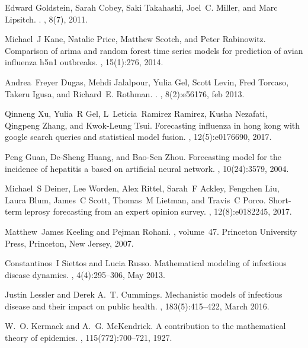 \documentclass[a4paper]{article}
\begin{document}
\begin{thebibliography}{100}
Edward Goldstein, Sarah Cobey, Saki Takahashi, Joel~C. Miller, and Marc
  Lipsitch.
.
, 8(7), 2011.

Michael~J Kane, Natalie Price, Matthew Scotch, and Peter Rabinowitz.
\newblock Comparison of arima and random forest time series models for
  prediction of avian influenza h5n1 outbreaks.
, 15(1):276, 2014.

Andrea~Freyer Dugas, Mehdi Jalalpour, Yulia Gel, Scott Levin, Fred Torcaso,
  Takeru Igusa, and Richard~E. Rothman.
.
, 8(2):e56176, feb 2013.

Qinneng Xu, Yulia~R Gel, L~Leticia~Ramirez Ramirez, Kusha Nezafati, Qingpeng
  Zhang, and Kwok-Leung Tsui.
\newblock Forecasting influenza in hong kong with google search queries and
  statistical model fusion.
, 12(5):e0176690, 2017.

Peng Guan, De-Sheng Huang, and Bao-Sen Zhou.
\newblock Forecasting model for the incidence of hepatitis a based on
  artificial neural network.
, 10(24):3579, 2004.

Michael~S Deiner, Lee Worden, Alex Rittel, Sarah~F Ackley, Fengchen Liu, Laura
  Blum, James~C Scott, Thomas~M Lietman, and Travis~C Porco.
\newblock Short-term leprosy forecasting from an expert opinion survey.
, 12(8):e0182245, 2017.

Matthew~James Keeling and Pejman Rohani.
, volume~47.
\newblock Princeton University Press, Princeton, New Jersey, 2007.

Constantinos~I Siettos and Lucia Russo.
\newblock Mathematical modeling of infectious disease dynamics.
, 4(4):295--306, May 2013.

Justin Lessler and Derek A.~T. Cummings.
\newblock Mechanistic models of infectious disease and their impact on public
  health.
, 183(5):415--422, March 2016.

W.~O. Kermack and A.~G. McKendrick.
\newblock A contribution to the mathematical theory of epidemics.
, 115(772):700--721, 1927.


\end{thebibliography}
\end{document}
